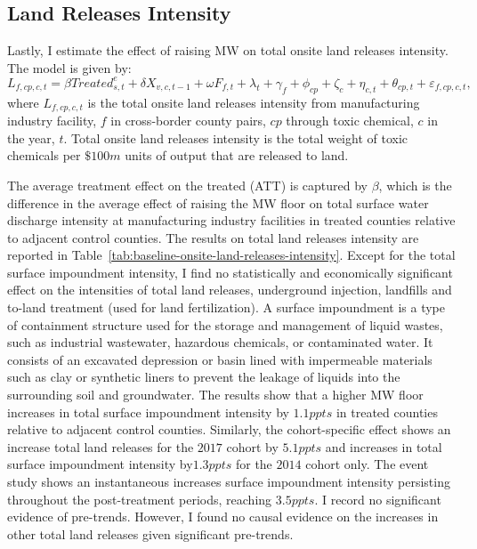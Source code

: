\documentclass[12pt, english]{article}
\begin{document}
    \subsection{Land Releases Intensity}\label{subsec:land-releases-intensity}
    Lastly, I estimate the effect of raising MW on total onsite land releases intensity. The model is given by:
    \begin{equation}
        L_{f,cp,c,t} = \beta Treated_{s,t}^e + \delta X_{v,c,t-1} + \omega F_{f,t} + \lambda_{t} + \gamma_{f} + \phi_{cp} + \zeta_{c} + \eta_{c,t} + \theta_{cp,t} + \varepsilon_{f,cp,c,t},\label{eq:baseline-onsite-land-releases-intensity}
    \end{equation}
    where $L_{f,cp,c,t}$ is the total onsite land releases intensity from manufacturing industry facility, $f$ in cross-border county pairs, $cp$ through toxic chemical, $c$ in the year, $t$. Total onsite land releases intensity is the total weight of toxic chemicals per $\$100m$ units of output that are released to land.
    

    The average treatment effect on the treated (ATT) is captured by $\beta$, which is the difference in the average effect of raising the MW floor on total surface water discharge intensity at manufacturing industry facilities in treated counties relative to adjacent control counties. The results on total land releases intensity are reported in Table~\ref{tab:baseline-onsite-land-releases-intensity}. Except for the total surface impoundment intensity, I find no statistically and economically significant effect on the intensities of total land releases, underground injection, landfills and to-land treatment (used for land fertilization). A surface impoundment is a type of containment structure used for the storage and management of liquid wastes, such as industrial wastewater, hazardous chemicals, or contaminated water. It consists of an excavated depression or basin lined with impermeable materials such as clay or synthetic liners to prevent the leakage of liquids into the surrounding soil and groundwater. The results show that a higher MW floor increases in total surface impoundment intensity by $1.1ppts$ in treated counties relative to adjacent control counties. Similarly, the cohort-specific effect shows an increase total land releases for the $2017$ cohort by $5.1ppts$ and increases in total surface impoundment intensity by$1.3ppts$ for the $2014$ cohort only. The event study shows an instantaneous increases surface impoundment intensity persisting throughout the post-treatment periods, reaching $3.5ppts$. I record no significant evidence of pre-trends. However, I found no causal evidence on the increases in other total land releases given significant pre-trends.
    
\end{document}
